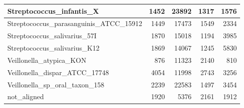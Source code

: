 \documentclass[12pt,a4paper]{article}
\begin{document}
\begin{table}[ht]
\begin{center}
\begin{tabular}{|l*{4}{|r}|}
Streptococcus\_infantis\_X & 1452 & 23892 & 1317 & 1576 \\ \hline
Streptococcus\_parasanguinis\_ATCC\_15912 & 1449 & 17473 & 1549 & 2334 \\ \hline
Streptococcus\_salivarius\_57I & 1870 & 15018 & 1194 & 3985 \\ \hline
Streptococcus\_salivarius\_K12 & 1869 & 14067 & 1245 & 5830 \\ \hline
Veillonella\_atypica\_KON & 876 & 11323 & 2140 & 810 \\ \hline
Veillonella\_dispar\_ATCC\_17748 & 4054 & 11998 & 2743 & 3256 \\ \hline
Veillonella\_sp\_oral\_taxon\_158 & 2239 & 22583 & 1497 & 3454 \\ \hline
not\_aligned & 1920 & 5376 & 2161 & 1912 \\ \hline
\end{tabular}
\end{center}
\end{table}
\end{document}
